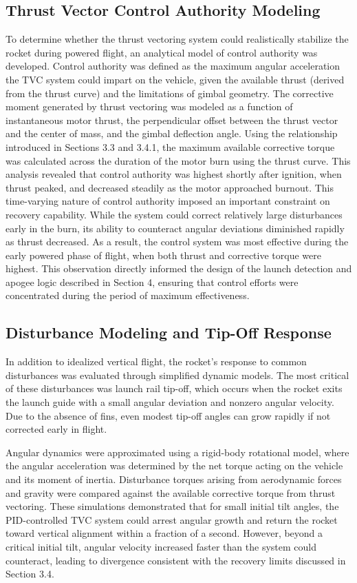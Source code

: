 \subsection{Thrust Vector Control Authority Modeling}

To determine whether the thrust vectoring system could realistically stabilize the rocket during powered flight, an analytical model of control authority was developed. Control authority was defined as the maximum angular acceleration the TVC system could impart on the vehicle, given the available thrust (derived from the thrust curve) and the limitations of gimbal geometry. 
The corrective moment generated by thrust vectoring was modeled as a function of instantaneous motor thrust, the perpendicular offset between the thrust vector and the center of mass, and the gimbal deflection angle. Using the relationship introduced in Sections 3.3 and 3.4.1, the maximum available corrective torque was calculated across the duration of the motor burn using the thrust curve. This analysis revealed that control authority was highest shortly after ignition, when thrust peaked, and decreased steadily as the motor approached burnout. 
This time-varying nature of control authority imposed an important constraint on recovery capability. While the system could correct relatively large disturbances early in the burn, its ability to counteract angular deviations diminished rapidly as thrust decreased. As a result, the control system was most effective during the early powered phase of flight, when both thrust and corrective torque were highest. This observation directly informed the design of the launch detection and apogee logic described in Section 4, ensuring that control efforts were concentrated during the period of maximum effectiveness.


\subsection{Disturbance Modeling and Tip-Off Response}

In addition to idealized vertical flight, the rocket’s response to common disturbances was evaluated through simplified dynamic models. The most critical of these disturbances was launch rail tip-off, which occurs when the rocket exits the launch guide with a small angular deviation and nonzero angular velocity. Due to the absence of fins, even modest tip-off angles can grow rapidly if not corrected early in flight.

Angular dynamics were approximated using a rigid-body rotational model, where the angular acceleration was determined by the net torque acting on the vehicle and its moment of inertia. Disturbance torques arising from aerodynamic forces and gravity were compared against the available corrective torque from thrust vectoring. These simulations demonstrated that for small initial tilt angles, the PID-controlled TVC system could arrest angular growth and return the rocket toward vertical alignment within a fraction of a second. However, beyond a critical initial tilt, angular velocity increased faster than the system could counteract, leading to divergence consistent with the recovery limits discussed in Section 3.4.

